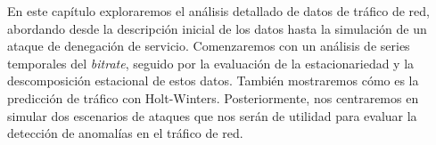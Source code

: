 En este capítulo exploraremos el análisis detallado de datos de tráfico de red, abordando desde la descripción inicial de los datos hasta la simulación de un ataque de denegación de servicio. Comenzaremos con un análisis de series temporales del \textit{bitrate}, seguido por la evaluación de la estacionariedad y la descomposición estacional de estos datos. También mostraremos cómo es la predicción de tráfico con Holt-Winters.
Posteriormente, nos centraremos en simular dos escenarios de ataques que nos serán de utilidad para evaluar la detección de anomalías en el tráfico de red.